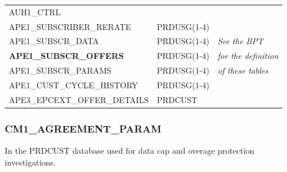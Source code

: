 \documentclass[12pt,twoside]{article}
\begin{document}
\begin{center}
\begin{tabular}{lll}
 AUH1\_CTRL                      &               &                             \\
 APE1\_SUBSCRIBER\_RERATE        &  PRDUSG(1-4)  &                             \\
 APE1\_SUBSCR\_DATA              &  PRDUSG(1-4)  &  \emph{See the BPT}         \\
 \textbf{APE1\_SUBSCR\_OFFERS}   &  PRDUSG(1-4)  &  \emph{for the definition}  \\
 APE1\_SUBSCR\_PARAMS            &  PRDUSG(1-4)  &  \emph{of these tables}     \\
 APE1\_CUST\_CYCLE\_HISTORY      &  PRDUSG(1-4)  &                             \\
 APE3\_EPCEXT\_OFFER\_DETAILS    &  PRDCUST      &                             \\
\hline
\end{tabular}
\end{center}
\subsubsection{CM1\_AGREEMENT\_PARAM}
\label{sec-8-3-1}

    In the PRDCUST database used for data cap and overage protection investigations.
\scriptsize
\end{document}
